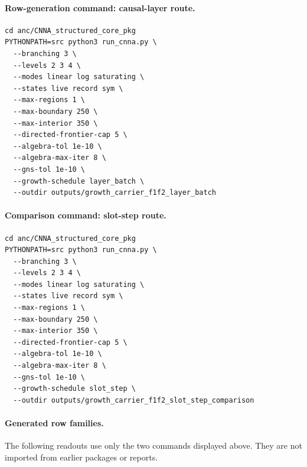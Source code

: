 \documentclass[11pt]{article}
\theoremstyle{remark}
\numberwithin{equation}{section}
\begin{document}
\paragraph{Row-generation command: causal-layer route.}
{\scriptsize
\begin{verbatim}
cd anc/CNNA_structured_core_pkg
PYTHONPATH=src python3 run_cnna.py \
  --branching 3 \
  --levels 2 3 4 \
  --modes linear log saturating \
  --states live record sym \
  --max-regions 1 \
  --max-boundary 250 \
  --max-interior 350 \
  --directed-frontier-cap 5 \
  --algebra-tol 1e-10 \
  --algebra-max-iter 8 \
  --gns-tol 1e-10 \
  --growth-schedule layer_batch \
  --outdir outputs/growth_carrier_f1f2_layer_batch
\end{verbatim}
}

\paragraph{Comparison command: slot-step route.}
{\scriptsize
\begin{verbatim}
cd anc/CNNA_structured_core_pkg
PYTHONPATH=src python3 run_cnna.py \
  --branching 3 \
  --levels 2 3 4 \
  --modes linear log saturating \
  --states live record sym \
  --max-regions 1 \
  --max-boundary 250 \
  --max-interior 350 \
  --directed-frontier-cap 5 \
  --algebra-tol 1e-10 \
  --algebra-max-iter 8 \
  --gns-tol 1e-10 \
  --growth-schedule slot_step \
  --outdir outputs/growth_carrier_f1f2_slot_step_comparison
\end{verbatim}
}

\paragraph{Generated row families.}
The following readouts use only the two commands displayed above. They are not imported from earlier packages or reports.
\end{document}
